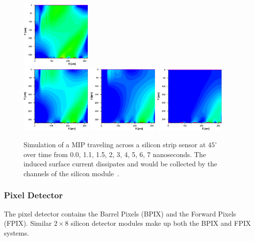 \begin{figure}[ht!b]
  \includegraphics[width=0.31\textwidth]{figures/silicon/silicon_t4.0.png}\\
  \includegraphics[width=0.31\textwidth]{figures/silicon/silicon_t5.0.png}
  \includegraphics[width=0.31\textwidth]{figures/silicon/silicon_t6.0.png}
  \includegraphics[width=0.31\textwidth]{figures/silicon/silicon_t7.0.png}\\
    \caption{Simulation of a MIP traveling across a silicon strip sensor at $45^\circ$ over time from 0.0, 1.1, 1.5, 2, 3, 4, 5, 6, 7 nanoseconds. The induced surface current dissipates and would be collected by the channels of the silicon module~\cite{Eichhorn:2112017}.}
\end{figure}





\subsubsection{Pixel Detector}
\label{sec:pixeldet}
The pixel detector contains the Barrel Pixels (BPIX) and the Forward Pixels (FPIX).  
Similar $2\times8$ silicon detector modules make up both the BPIX and FPIX systems.

